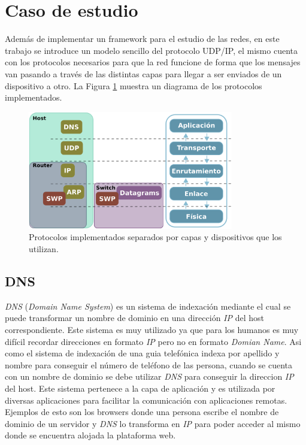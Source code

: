 \documentclass[10pt,a4paper]{article}
\begin{document}
\section{Caso de estudio}
	Además de implementar un framework para el estudio de las redes, en este trabajo se introduce un modelo sencillo del protocolo UDP/IP, el mismo cuenta con los protocolos necesarios para que la red funcione de forma que los mensajes van pasando a través de las distintas capas para llegar a ser enviados de un dispositivo a otro. La Figura \ref{figure: protocolos} muestra un diagrama de los protocolos implementados. \\

\begin{figure}[!htb]
    \centering
    \includegraphics[width = 0.8\textwidth]{img/png/protocols.png}
    \caption{Protocolos implementados separados por capas y dispositivos que los utilizan.}
    \label{figure: protocolos}
\end{figure}
	
\subsection{DNS}
\textit{DNS} (\textit{Domain Name System}) es un sistema de indexación mediante el cual se puede transformar un nombre de dominio en una dirección \textit{IP} del host correspondiente. Este sistema es muy utilizado ya que para los humanos es muy difícil recordar direcciones en formato \textit{IP} pero no en formato \textit{Domian Name}. Asi como el sistema de indexación de una guia telefónica indexa por apellido y nombre para conseguir el número de teléfono de las persona, cuando se cuenta con un nombre de dominio se debe utilizar \textit{DNS} para conseguir la direccion \textit{IP} del host. Este sistema pertenece a la capa de aplicación y es utilizada por diversas aplicaciones para facilitar la comunicación con aplicaciones remotas. Ejemplos de esto son los browsers donde una persona escribe el nombre de dominio de un servidor y \textit{DNS} lo transforma en \textit{IP} para poder acceder al mismo donde se encuentra alojada la plataforma web. 
\end{document}
